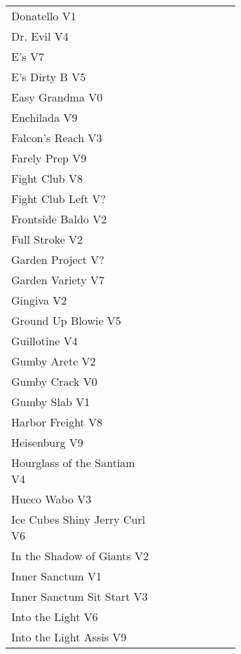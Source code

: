 \begin{flushleft}
\begin{center}
\begin{supertabular}{p{0.65\linewidth}r}
Donatello V1 & \pageref{rt:Donatello} \\
Dr. Evil V4 & \pageref{rt:Dr. Evil} \\
E's V7 & \pageref{rt:E's} \\
E's Dirty B V5 & \pageref{rt:E's Dirty B} \\
Easy Grandma V0 & \pageref{rt:Easy Grandma} \\
Enchilada V9 & \pageref{rt:Enchilada} \\
Falcon's Reach V3 & \pageref{rt:Falcon's Reach} \\
Farely Prep V9 & \pageref{rt:Farely Prep} \\
Fight Club V8 & \pageref{rt:Fight Club} \\
Fight Club Left V? & \pageref{rt:Fight Club Left} \\
Frontside Baldo V2 & \pageref{rt:Frontside Baldo} \\
Full Stroke V2 & \pageref{rt:Full Stroke} \\
Garden Project V? & \pageref{rt:Garden Project} \\
Garden Variety V7 & \pageref{rt:Garden Variety} \\
Gingiva V2 & \pageref{rt:Gingiva} \\
Ground Up Blowie V5 & \pageref{rt:Ground Up Blowie} \\
Guillotine V4 & \pageref{rt:Guillotine} \\
Gumby Arete V2 & \pageref{rt:Gumby Arete} \\
Gumby Crack V0 & \pageref{rt:Gumby Crack} \\
Gumby Slab V1 & \pageref{rt:Gumby Slab} \\
Harbor Freight V8 & \pageref{vr:Harbor Freight} \\
Heisenburg V9 & \pageref{rt:Heisenburg} \\
Hourglass of the Santiam V4 & \pageref{rt:Hourglass of the Santiam} \\
Hueco Wabo V3 & \pageref{rt:Hueco Wabo} \\
Ice Cubes Shiny Jerry Curl V6 & \pageref{rt:Ice Cubes Shiny Jerry Curl} \\
In the Shadow of Giants V2 & \pageref{rt:In the Shadow of Giants} \\
Inner Sanctum V1 & \pageref{rt:Inner Sanctum} \\
Inner Sanctum Sit Start V3 & \pageref{vr:Inner Sanctum Sit Start} \\
Into the Light V6 & \pageref{rt:Into the Light} \\
Into the Light Assis V9 & \pageref{vr:Into the Light Assis} \\

\end{supertabular}
\end{center}
\end{flushleft}
